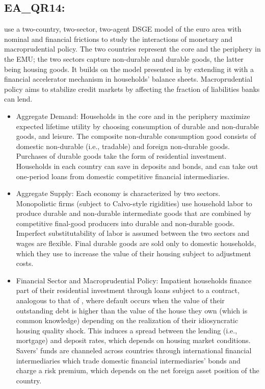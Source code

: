\documentclass[11pt,a4paper]{article}
\begin{document}
	\subsection{EA\_QR14: \cite{QR2014}}
	\label{EAQR14}
	\cite{QR2014} use a two-country, two-sector, two-agent DSGE model of the euro area with nominal and financial frictions to study the interactions of monetary and macroprudential policy. The two countries represent the core and the periphery in the EMU; the two sectors capture non-durable and durable goods, the latter being housing goods. It builds on the model presented in \cite{Rabanal2009} by extending it with a financial accelerator mechanism in households' balance sheets. Macroprudential policy aims to stabilize credit markets by affecting the fraction of liabilities banks can lend.
	\begin{itemize}
		\item Aggregate Demand: Households in the core and in the periphery maximize expected lifetime utility by choosing consumption of durable and non-durable goods, and leisure. The composite non-durable consumption good consists of domestic non-durable (i.e., tradable) and foreign non-durable goods. Purchases of durable goods take the form of residential investment. Households in each country can save in deposits and bonds, and can take out one-period loans from domestic competitive financial intermediaries.
		\item Aggregate Supply: Each economy is characterized by two sectors. Monopolistic firms (subject to Calvo-style rigidities) use household labor to produce durable and non-durable intermediate goods that are combined by competitive final-good producers into durable and non-durable goods. Imperfect substitutability of labor is assumed between the two sectors and wages are flexible. Final durable goods are sold only to domestic households, which they use to increase the value of their housing  subject to adjustment costs.
		\item Financial Sector and Macroprudential Policy: Impatient households finance part of their residential investment through loans subject to a contract, analogous to that of \cite{BernankeGertlerGilchrist1999}, where default occurs when the value of their outstanding debt is higher than the value of the house they own (which is common knowledge)  depending on the realization of their idiosyncratic housing quality shock. This induces a spread between the lending (i.e., mortgage) and deposit rates, which depends on housing market conditions. Savers' funds are channeled across countries through international financial intermediaries which trade domestic financial intermediaries' bonds and charge a risk premium, which depends on the net foreign asset position of the country.

\end{itemize}
\end{document}
